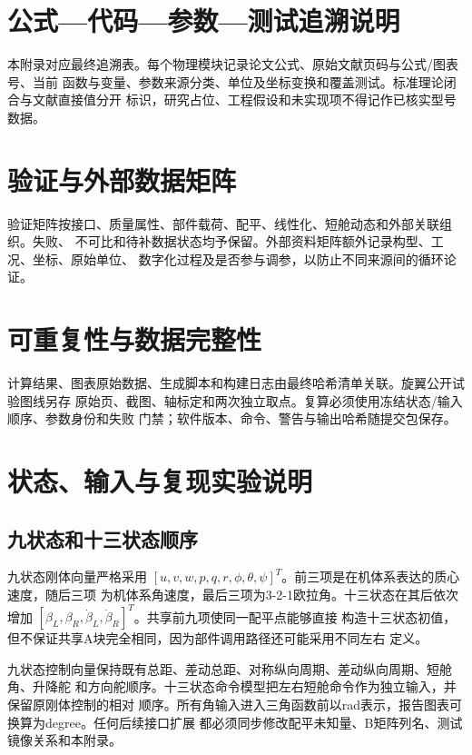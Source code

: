 \documentclass[UTF8,12pt,oneside,openany,fontset=windows]{ctexbook}
\begin{document}
\appendix
\chapter{公式—代码—参数—测试追溯说明}

本附录对应最终追溯表。每个物理模块记录论文公式、原始文献页码与公式/图表号、当前 函数与变量、参数来源分类、单位及坐标变换和覆盖测试。标准理论闭合与文献直接值分开 标识，研究占位、工程假设和未实现项不得记作已核实型号数据。

\chapter{验证与外部数据矩阵}

验证矩阵按接口、质量属性、部件载荷、配平、线性化、短舱动态和外部关联组织。失败、 不可比和待补数据状态均予保留。外部资料矩阵额外记录构型、工况、坐标、原始单位、 数字化过程及是否参与调参，以防止不同来源间的循环论证。

\chapter{可重复性与数据完整性}

计算结果、图表原始数据、生成脚本和构建日志由最终哈希清单关联。旋翼公开试验图线另存 原始页、截图、轴标定和两次独立取点。复算必须使用冻结状态/输入顺序、参数身份和失败 门禁；软件版本、命令、警告与输出哈希随提交包保存。

\chapter{状态、输入与复现实验说明}

\section{九状态和十三状态顺序}

九状态刚体向量严格采用 \([u,v,w,p,q,r,\phi,\theta,\psi]^T\)。前三项是在机体系表达的质心速度，随后三项 为机体系角速度，最后三项为3-2-1欧拉角。十三状态在其后依次增加 \([\beta_L,\beta_R,\dot\beta_L,\dot\beta_R]^T\)。共享前九项使同一配平点能够直接 构造十三状态初值，但不保证共享A块完全相同，因为部件调用路径还可能采用不同左右 定义。

九状态控制向量保持既有总距、差动总距、对称纵向周期、差动纵向周期、短舱角、升降舵 和方向舵顺序。十三状态命令模型把左右短舱命令作为独立输入，并保留原刚体控制的相对 顺序。所有角输入进入三角函数前以rad表示，报告图表可换算为degree。任何后续接口扩展 都必须同步修改配平未知量、B矩阵列名、测试镜像关系和本附录。
\end{document}
